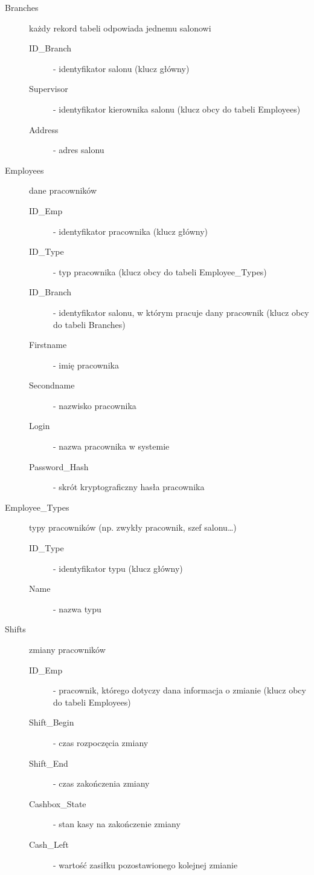 \begin{description}
\item[Branches] każdy rekord tabeli odpowiada jednemu salonowi
    \begin{description}
    \item[ID\_Branch] - identyfikator salonu (klucz główny)
    \item[Supervisor] - identyfikator kierownika salonu (klucz obcy do tabeli Employees)
    \item[Address] - adres salonu
    \end{description}
\item[Employees] dane pracowników
    \begin{description}
    \item[ID\_Emp] - identyfikator pracownika (klucz główny)
    \item[ID\_Type] - typ pracownika (klucz obcy do tabeli Employee\_Types)
    \item[ID\_Branch] - identyfikator salonu, w którym pracuje dany pracownik (klucz obcy do tabeli Branches)
    \item[Firstname] - imię pracownika
    \item[Secondname] - nazwisko pracownika
    \item[Login] - nazwa pracownika w systemie
    \item[Password\_Hash] - skrót kryptograficzny hasła pracownika
    \end{description}
\item[Employee\_Types] typy pracowników (np. zwykły pracownik, szef salonu\ldots)
    \begin{description}
    \item[ID\_Type] - identyfikator typu (klucz główny)
    \item[Name] - nazwa typu
    \end{description}
\item[Shifts] zmiany pracowników
    \begin{description}
    \item[ID\_Emp] - pracownik, którego dotyczy dana informacja o zmianie (klucz obcy do tabeli Employees)
    \item[Shift\_Begin] - czas rozpoczęcia zmiany
    \item[Shift\_End] - czas zakończenia zmiany
    \item[Cashbox\_State] - stan kasy na zakończenie zmiany
    \item[Cash\_Left] - wartość zasiłku pozostawionego kolejnej zmianie

\end{description}
\end{description}
